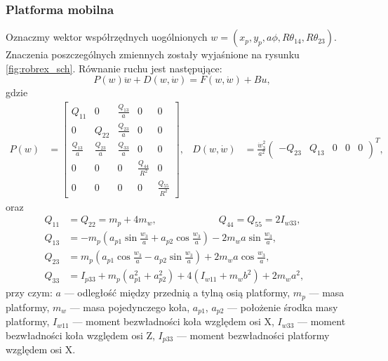 \subsubsection{Platforma mobilna}
\hspace{\parindent}Oznaczmy wektor współrzędnych uogólnionych $w=(x_p, y_p, a\phi, R\theta_14, R\theta_23)$. Znaczenia poszczególnych zmiennych zostały wyjaśnione na rysunku \ref{fig:robrex_sch}. Równanie ruchu jest następujące:
\begin{equation}
P(w)\ddot w + D(w, \dot w) = F(w, \dot w) + Bu,
\end{equation}
gdzie
\begin{align}
P(w) &= \begin{bmatrix}
Q_{11} & 0 & \frac{Q_{13}}{a} & 0 & 0\\
0 & Q_{22} & \frac{Q_{23}}{a} & 0 & 0\\
\frac{Q_{13}}{a} & \frac{Q_{23}}{a} & \frac{Q_{33}}{a} & 0 & 0\\
0 & 0 & 0 & \frac{Q_{44}}{R^2} & 0 \\
0 & 0 & 0 & 0 & \frac{Q_{55}}{R^2}
\end{bmatrix}, & 
D(w, \dot w) &= \frac{\dot w_3^2}{a^2}\begin{pmatrix}
-Q_{23} & Q_{13} & 0 & 0 & 0
\end{pmatrix}^T,
\end{align}
oraz
\begin{align}
Q_{11} &= Q_{22} = m_p+4m_w, \phantom{xxxxxxxxxxx} Q_{44} = Q_{55} = 2I_{w33},\\
Q_{13} &= -m_p(a_{p1}\sin\frac{w_3}{a}+a_{p2}\cos\frac{w_3}{a})- 2m_wa\sin\frac{w_3}{a}, & &\\
Q_{23} &=  m_p(a_{p1}\cos\frac{w_3}{a}-a_{p2}\sin\frac{w_3}{a})+ 2m_wa\cos\frac{w_3}{a}, & &\\
Q_{33} &= I_{p33}+m_p(a_{p1}^2+a_{p2}^2)+4(I_{w11}+m_wb^2)+2m_wa^2,
\end{align}
przy czym:
$a$ --- odległość między przednią a tylną osią platformy,
$m_p$ --- masa platformy,
$m_w$ --- masa pojedynczego koła,
$a_{p1}$, $a_{p2}$ --- położenie środka masy platformy,
$I_{w11}$ --- moment bezwładności koła względem osi X,
$I_{w33}$ --- moment bezwładności koła względem osi Z,
$I_{p33}$ --- moment bezwładności platformy względem osi X.

